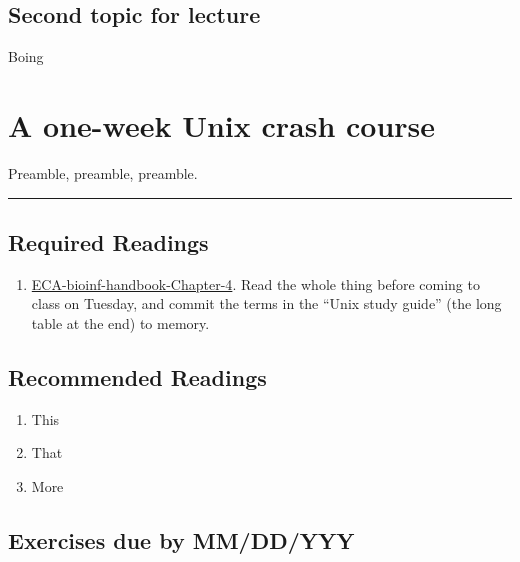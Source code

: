 \documentclass[]{book}
\providecommand{\tightlist}{%
  \setlength{\itemsep}{0pt}\setlength{\parskip}{0pt}}
\begin{document}
\hypertarget{second-topic-for-lecture}{%
\section{Second topic for lecture}\label{second-topic-for-lecture}}

Boing

\hypertarget{a-one-week-unix-crash-course}{%
\chapter{A one-week Unix crash course}\label{a-one-week-unix-crash-course}}

Preamble, preamble, preamble.

\begin{center}\rule{0.5\linewidth}{\linethickness}\end{center}

\hypertarget{required-readings-1}{%
\section*{Required Readings}\label{required-readings-1}}

\begin{enumerate}
\def\labelenumi{\arabic{enumi}.}
\tightlist
\item
  \href{https://eriqande.github.io/eca-bioinf-handbook/essential-unixlinux-terminal-knowledge.html}{ECA-bioinf-handbook-Chapter-4}. Read the whole
  thing before coming to class on Tuesday, and commit the terms in the ``Unix study guide'' (the long table at the end) to memory.
\end{enumerate}

\hypertarget{recommended-readings-1}{%
\section*{Recommended Readings}\label{recommended-readings-1}}

\begin{enumerate}
\def\labelenumi{\arabic{enumi}.}
\tightlist
\item
  This
\item
  That
\item
  More
\end{enumerate}

\hypertarget{exercises-due-by-mmddyyy-1}{%
\section*{Exercises due by MM/DD/YYY}\label{exercises-due-by-mmddyyy-1}}
\end{document}
